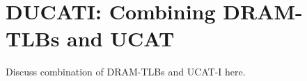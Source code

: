 \section{DUCATI: Combining DRAM-TLBs \newline and UCAT}
\label{sec:DUCATI}

Discuss combination of DRAM-TLBs and UCAT-I here.